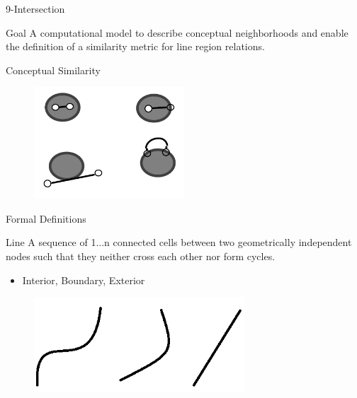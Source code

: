 

\begin{frame}{9-Intersection}
	\begin{block}{Goal} 
	A computational model to describe conceptual neighborhoods and enable the definition of a similarity metric for line region relations.
		\end{block}
	\begin{block}{Conceptual Similarity}
	\begin{figure}
	\includegraphics[width = 0.5\textwidth]{images/conceptualsimilarity.png}
	\end{figure}
\end{block}			
\end{frame}

\begin{frame}{Formal Definitions}
	\begin{block}{Line}
	A sequence of 1...n connected cells between two geometrically independent nodes such that they neither cross each other nor form cycles.
	\begin{itemize}
	\item Interior, Boundary, Exterior
	\end{itemize}
\end{block}		
		\begin{figure}
		\includegraphics[width=0.7\textwidth]{images/line.png}
\end{figure}
\end{frame}

